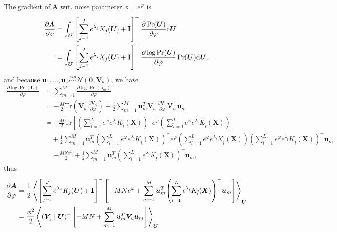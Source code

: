 \documentclass[11pt]{article}
\def\style{apa}
\newcommand{\bs}{\boldsymbol}
\newcommand{\mean}[2]{\left\langle{#1}\right\rangle_{#2}}
\newcommand{\trb}[1]{\textrm{Tr}\left({#1}\right)}
\newcommand{\trs}[1]{\textrm{Tr}\left[{#1}\right]}
\newcommand{\invb}[1]{{\left({#1}\right)^-}}
\newcommand{\invs}[1]{{\left[{#1}\right]^-}}
\newcommand{\vu}{\boldsymbol{u}}
\newcommand{\xv}{\boldsymbol{V}}
\newcommand{\xx}{\boldsymbol{X}}
\newcommand{\xu}{\boldsymbol{U}}
\newcommand{\xa}{\boldsymbol{A}}
\newcommand{\id}{\textrm{\textbf{I}}}
\newcommand{\PDV}[2]{\frac{\partial #1}{\partial #2}}
\begin{document}
The gradient of $\xa$ wrt. noise parameter $\phi=e^\varphi$ is
\begin{align*}
  \PDV{\xa}{\varphi} &= \int_{\xu} \left[ \sum_{j=1}^J{e^{\lambda_j} K_j(\xu)} + \id \right]^- \PDV{\Pr(\xu)}{\varphi} \textrm{d}\xu \\
                     &= \int_{\xu} \left[ \sum_{j=1}^J{e^{\lambda_j} K_j(\xu)} + \id \right]^- \PDV{\log\Pr(\xu)}{\varphi} \Pr(\xu)\textrm{d}\xu,
\end{align*}
and because $\vu_1, \dots, \vu_M \overset{iid}{\sim} \mathcal{N}\left(\bs{0}, \xv_u \right)$, we have
\begin{equation*}
  \begin{split}
    \PDV{\log\Pr(\xu)}{\varphi}
    &= \sum_{m=1}^M \PDV{\log\Pr(\vu_m)}{\varphi} \\
    &= -\frac{M}{2}\trb{\xv_u^-\PDV{\xv_u}{\varphi}} + \frac{1}{2}\sum_{m=1}^M \vu_m^T \xv_u^- \PDV{\xv_u}{\varphi} \xv_u^- \vu_m \\
    &= -\frac{M}{2}\trs{
      \invb{\sum_{\tilde{l}=1}^L e^{\varphi}e^{\lambda_{\tilde{l}}}K_{\tilde{l}}(\xx)}
      e^{\varphi}
      \left(\sum_{\tilde{l}=1}^L e^{\varphi}e^{\lambda_{\tilde{l}}}K_{\tilde{l}}(\xx)\right)} \\
    &\quad  +\frac{1}{2}\sum_{m=1}^M
    \vu_m^T
    \invb{\sum_{\tilde{l}=1}^L e^{\varphi}e^{\lambda_{\tilde{l}}}K_{\tilde{l}}(\xx)}
    e^{\varphi}
    \left(\sum_{\tilde{l}=1}^L e^{\varphi}e^{\lambda_{\tilde{l}}}K_{\tilde{l}}(\xx)\right)
    \invb{\sum_{\tilde{l}=1}^L e^{\varphi}e^{\lambda_{\tilde{l}}}K_{\tilde{l}}(\xx)}
    \vu_m \\
    &= -\frac{MNe^\varphi}{2} + \frac{1}{2}\sum_{m=1}^M \vu_m^T \invb{\sum_{\tilde{l}=1}^L e^{\lambda_{\tilde{l}}}K_{\tilde{l}}(\xx)} \vu_m,
  \end{split}
\end{equation*}
thus
\begin{equation} \label{eq:tie_phi_dvt}
  \begin{split}
    \PDV{\xa}{\varphi}
    &= \frac{1}{2}\mean{
      \invs{\sum_{j=1}^J{e^{\lambda_j} K_j(\xu)} + \id}
      \left[
        -MNe^\varphi + \sum_{m=1}^M \vu_m^T \invb{\sum_{\tilde{l}=1}^L e^{\lambda_{\tilde{l}}}K_{\tilde{l}}(\xx)} \vu_m
      \right]
    }{\xu} \\
    &= \frac{\phi^2}{2}\mean{
      \invb{\xv_y\mid\xu}
      \left[
        -MN + \sum_{m=1}^M \vu_m^T \xv_u \vu_m
      \right]    }{\xu}
  \end{split}
\end{equation}
\singlespacing 


\end{document}
